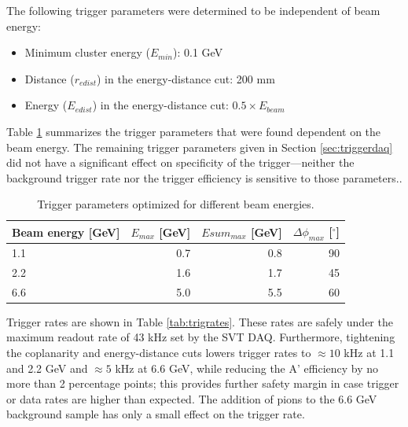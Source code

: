 The following trigger parameters were determined to be independent of beam energy:
\begin{itemize}
	\item Minimum cluster energy ($E_{min}$): 0.1 GeV
	\item Distance ($r_{edist}$) in the energy-distance cut: 200 mm
	\item Energy ($E_{edist}$) in the energy-distance cut: $0.5\times E_{beam}$
\end{itemize}

Table \ref{tab:trigcuts} summarizes the trigger parameters that were found dependent on the beam energy. 
The remaining trigger parameters given in Section \ref{sec:triggerdaq} did not have a significant 
effect on specificity of the trigger---neither the background trigger rate nor the trigger efficiency is sensitive to those parameters..

\begin{table}
	\begin{tabular}{|l|r|r|r|}
		\hline
		Beam energy [GeV] & $E_{max}$ [GeV] & $Esum_{max}$ [GeV] & $\Delta\phi_{max}$ [$^\circ$] \\
		\hline
		1.1	&	0.7	&	0.8	&	90\\
		2.2	&	1.6	&	1.7	&	45\\
		6.6	&	5.0	&	5.5	&	60\\
		\hline
	\end{tabular}
	\caption{ {\small Trigger parameters optimized for different beam energies.}
	\label{tab:trigcuts}}
\end{table}

Trigger rates are shown in Table \ref{tab:trigrates}. These rates are safely under the maximum readout rate of 43 kHz set by the SVT DAQ. 
Furthermore, tightening the coplanarity and energy-distance cuts lowers trigger rates to $\approx 10$ kHz at 1.1 and 2.2 GeV and $\approx 5$ kHz at 6.6 GeV, while reducing the A' efficiency by no more than 2 percentage points; this provides further safety margin in case trigger or data rates are higher than expected.
The addition of pions to the 6.6 GeV background sample has only a small effect on the trigger rate.

